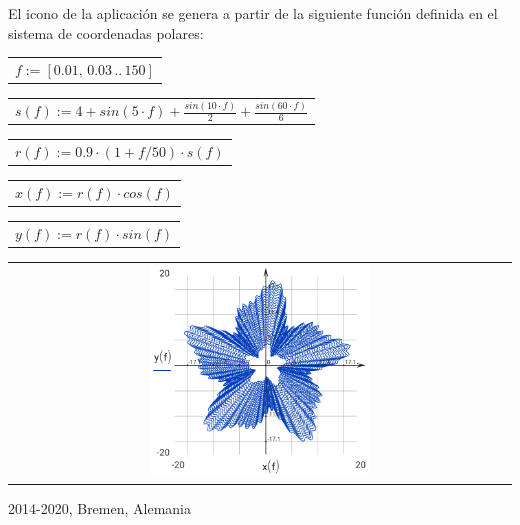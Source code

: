 \documentclass[DIV=calc, paper=a4, fontsize=11pt, twocolumn]{scrartcl}
\begin{document}
El icono de la aplicación se genera a partir de la siguiente
función definida en el
sistema de coordenadas polares:
\begin{center}\begin{tabular}{c}
                $f := \left[ 0.01,\, 0.03 \,..\, 150 \right]$
\end{tabular}\end{center}
\begin{center}\begin{tabular}{c}
                $s(f) := 4 + sin \left( 5 \cdot f\right)  + \frac{sin \left( 10 \cdot f\right) }{2} + \frac{sin \left( 60 \cdot f\right) }{6}$
\end{tabular}\end{center}
\begin{center}\begin{tabular}{c}
                $r(f) := 0.9 \cdot \left( 1 + f / 50 \right) \cdot s \left( f\right) $
\end{tabular}\end{center}
\begin{center}\begin{tabular}{c}
                $x(f) := r \left( f\right)  \cdot cos \left( f\right) $
\end{tabular}\end{center}
\begin{center}\begin{tabular}{c}
                $y(f) := r \left( f\right)  \cdot sin \left( f\right) $
\end{tabular}\end{center}
\begin{center}\begin{tabular}{c} \includegraphics[width=0.45\textwidth]{graphics/about_micromath_fig1.png} \end{tabular}\end{center}

2014-2020, Bremen, Alemania
\end{document}
